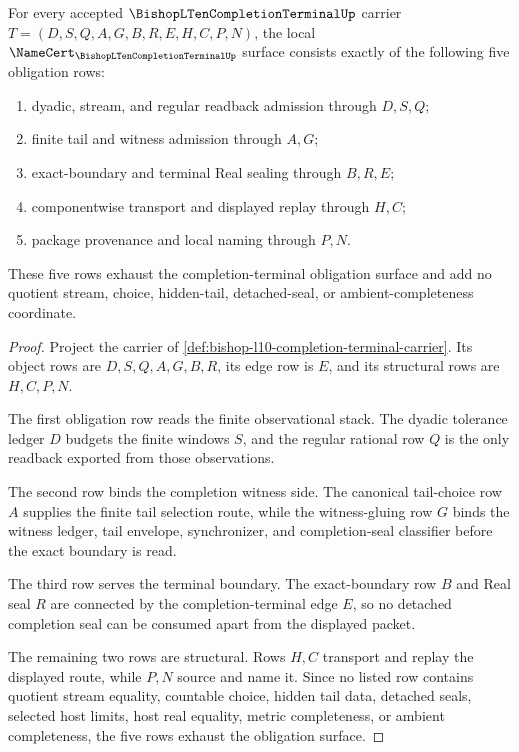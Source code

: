 \begin{theorem}
\label{thm:bishop-l10-completion-terminal-namecert-obligations}
For every accepted $\BishopLTenCompletionTerminalUp$ carrier $T=(D,S,Q,A,G,B,R,E,H,C,P,N)$, the local $\NameCert_{\BishopLTenCompletionTerminalUp}$ surface consists exactly of the following five obligation rows:
\begin{enumerate}
\item dyadic, stream, and regular readback admission through $D,S,Q$;
\item finite tail and witness admission through $A,G$;
\item exact-boundary and terminal Real sealing through $B,R,E$;
\item componentwise transport and displayed replay through $H,C$;
\item package provenance and local naming through $P,N$.
\end{enumerate}
These five rows exhaust the completion-terminal obligation surface and add no quotient stream, choice, hidden-tail, detached-seal, or ambient-completeness coordinate.
\end{theorem}
\begin{proof}
Project the carrier of \autoref{def:bishop-l10-completion-terminal-carrier}. Its object rows are $D,S,Q,A,G,B,R$, its edge row is $E$, and its structural rows are $H,C,P,N$.

The first obligation row reads the finite observational stack. The dyadic tolerance ledger $D$ budgets the finite windows $S$, and the regular rational row $Q$ is the only readback exported from those observations.

The second row binds the completion witness side. The canonical tail-choice row $A$ supplies the finite tail selection route, while the witness-gluing row $G$ binds the witness ledger, tail envelope, synchronizer, and completion-seal classifier before the exact boundary is read.

The third row serves the terminal boundary. The exact-boundary row $B$ and Real seal $R$ are connected by the completion-terminal edge $E$, so no detached completion seal can be consumed apart from the displayed packet.

The remaining two rows are structural. Rows $H,C$ transport and replay the displayed route, while $P,N$ source and name it. Since no listed row contains quotient stream equality, countable choice, hidden tail data, detached seals, selected host limits, host real equality, metric completeness, or ambient completeness, the five rows exhaust the obligation surface.
\end{proof}


